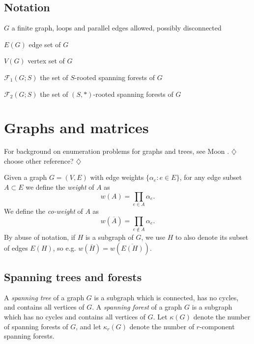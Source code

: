 \documentclass{amsart}
\theoremstyle{definition}
\newcommand{\RR}{\mathbb{R}}
\newcommand{\trees}{\mathcal{F}_1}
\newcommand{\forests}{\mathcal{F}}
\newcommand{\coweight}[1]{w(\overline{#1})}
\newcommand{\note}[1]{{\color{red} \sf $\diamondsuit$  {#1} $\diamondsuit$ }}
\begin{document}
\subsection{Notation}


$G$ a finite graph, 
loops and parallel edges allowed,
possibly disconnected

$E(G)$ edge set of $G$

$V(G)$ vertex set of $G$




%

$\trees(G;S)$ the set of $S$-rooted spanning forests of $G$

$\forests_2(G;S)$ the set of $(S,*)$-rooted spanning forests of $G$


\section{Graphs and matrices}
\label{sec:graphs-matrices}

For background on enumeration problems for graphs and trees, see Moon \cite{moon}. \note{choose other reference?}

Given a graph $G = (V, E)$ with edge weights $\{ \alpha_e : e \in E\}$, for any edge subset $A \subset E$ we define the {\em weight} of $A$ as
\[
	w(A) = \prod_{e \in A} \alpha_e.
\]
We define the {\em co-weight} of $A$ as
\[
	w(\overline A) = \prod_{e \not\in A} \alpha_e.
\]
By abuse of notation, if $H$ is a subgraph of $G$, we use $H$ to also denote its subset of edges $E(H)$, so e.g. $\coweight{H} = \coweight{E(H)}$.

\subsection{Spanning trees and forests}
A {\em spanning tree} of a graph $G$ is a subgraph which 
is connected, has no cycles,
and contains all vertices of $G$.
A {\em spanning forest} of a graph $G$ is a subgraph which 
has no cycles
and 
contains all vertices of $G$. 
Let $\kappa(G)$ denote the number of spanning forests of $G$, and let $\kappa_r(G)$ denote the number of $r$-component spanning forests.
\end{document}
